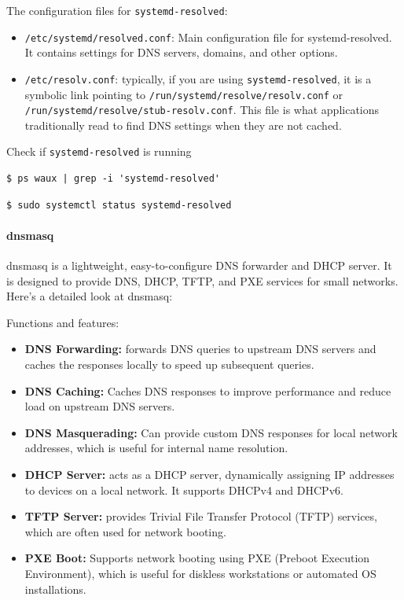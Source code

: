 \documentclass{article}
\newenvironment{codetemplate}[1][]{%
  \mybasecolorbox[#1]
  \itshape
}{%
  \endmybasecolorbox
}
\begin{document}
The configuration files for \verb+systemd-resolved+:

\begin{itemize}
    \item \verb+/etc/systemd/resolved.conf+: Main configuration file for systemd-resolved. It contains settings for DNS servers, domains, and other options.
    \item \verb+/etc/resolv.conf+: typically, if you are using \verb+systemd-resolved+, it is a symbolic link pointing to    \verb+/run/systemd/resolve/resolv.conf+ or \verb+/run/systemd/resolve/stub-resolv.conf+. This file is what applications traditionally read to find DNS settings when they are not cached.
\end{itemize}

Check if \verb|systemd-resolved| is running
\begin{codetemplate}{}
\begin{verbatim}
$ ps waux | grep -i 'systemd-resolved'
\end{verbatim}
\end{codetemplate}
\begin{codetemplate}{}
\begin{verbatim}
$ sudo systemctl status systemd-resolved
\end{verbatim}
\end{codetemplate}

\paragraph{dnsmasq}

dnsmasq is a lightweight, easy-to-configure DNS forwarder and DHCP server. It is designed to provide DNS, DHCP, TFTP, and PXE services for small networks. Here's a detailed look at dnsmasq:

Functions and features:

\begin{itemize}
    \item \textbf{DNS Forwarding:} forwards DNS queries to upstream DNS servers and caches the responses locally to speed up subsequent queries.
    \item \textbf{DNS Caching:} Caches DNS responses to improve performance and reduce load on upstream DNS servers.
    \item \textbf{DNS Masquerading:} Can provide custom DNS responses for local network addresses, which is useful for internal name resolution.
    \item \textbf{DHCP Server:} acts as a DHCP server, dynamically assigning IP addresses to devices on a local network. It supports DHCPv4 and DHCPv6.
    \item \textbf{TFTP Server:} provides Trivial File Transfer Protocol (TFTP) services, which are often used for network booting.
    \item \textbf{PXE Boot:} Supports network booting using PXE (Preboot Execution Environment), which is useful for diskless workstations or automated OS installations.
\end{itemize}
\end{document}

